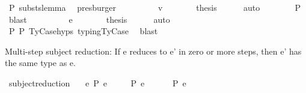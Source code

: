 \begin{isabellebody}
\ P{}\ substs{\isacharunderscore}{\kern0pt}lemma\ \isamarkupfalse%
\ presburger\isanewline
\ \ \isamarkupfalse%
\isanewline
\ \ \ \ \isamarkupfalse%
\ {\isacharparenleft}{\kern0pt}{}\ v{\isacharparenright}{\kern0pt}\isanewline
\ \ \ \ \isamarkupfalse%
\ \isamarkupfalse%
\ {\isacharquery}{\kern0pt}thesis\isanewline
\ \ \ \ \isamarkupfalse%
\ auto\isanewline
\ \ \ \ \ \ \isamarkupfalse%
\ P{}\ \isamarkupfalse%
\ blast\isanewline
\ \ \isamarkupfalse%
\isanewline
\ \ \ \ \isamarkupfalse%
\ {\isacharparenleft}{\kern0pt}{}\ e{}{\isacharprime}{\kern0pt}{\isacharparenright}{\kern0pt}\isanewline
\ \ \ \ \isamarkupfalse%
\ \isamarkupfalse%
\ {\isacharquery}{\kern0pt}thesis\isanewline
\ \ \ \ \isamarkupfalse%
\ auto\isanewline
\ \ \ \ \ \ \isamarkupfalse%
\ P{}\ P{}\ TyCase{\isachardot}{\kern0pt}hyps{\isacharparenleft}{\kern0pt}{}{\isacharparenright}{\kern0pt}\ typing{\isachardot}{\kern0pt}TyCase\ \isamarkupfalse%
\ blast\isanewline
\ \ \isamarkupfalse%
\isanewline
{}\isamarkupfalse%
%
\endisatagproof
{\isafoldproof}%
%
\isadelimproof
%
\endisadelimproof
%
\begin{isamarkuptext}%
Multi-step subject reduction:
  If e reduces to e' in zero or more steps,
  then e' has the same type as e.%
\end{isamarkuptext}\isamarkuptrue%
\isamarkupfalse%
\ subject{\isacharunderscore}{\kern0pt}reduction{\isacharprime}{\kern0pt}{\isacharcolon}{\kern0pt}\isanewline
\ \ \ {\isachardoublequoteopen}e\ {\isacharminus}{\kern0pt}{\isachargreater}{\kern0pt}{\isacharbraceleft}{\kern0pt}P{\isacharbraceright}{\kern0pt}{\isacharasterisk}{\kern0pt}\ e{\isacharprime}{\kern0pt}{\isachardoublequoteclose}\isanewline
\ \ \ \ {\isachardoublequoteopen}{\isasymGamma}\ {\isasymturnstile}{\isacharbraceleft}{\kern0pt}P{\isacharbraceright}{\kern0pt}\ e\ {\isacharcolon}{\kern0pt}\ {\isasymtau}{\isachardoublequoteclose}\isanewline
\ \ \ {\isachardoublequoteopen}{\isasymGamma}\ {\isasymturnstile}{\isacharbraceleft}{\kern0pt}P{\isacharbraceright}{\kern0pt}\ e{\isacharprime}{\kern0pt}\ {\isacharcolon}{\kern0pt}\ {\isasymtau}{\isachardoublequoteclose}\isanewline

\end{isabellebody}

